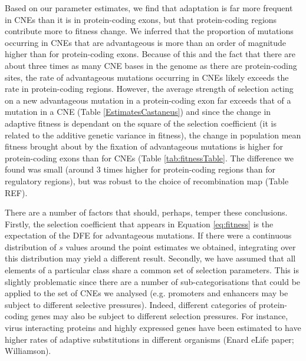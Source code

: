 \documentclass[11pt]{article}
\begin{document}
	Based on our parameter estimates, we find that adaptation is far more frequent in CNEs than it is in protein-coding exons, but that protein-coding regions contribute more to fitness change. We inferred that the proportion of mutations occurring in CNEs that are advantageous is more than an order of magnitude higher than for protein-coding exons. Because of this and the fact that there are about three times as many CNE bases in the genome as there are protein-coding sites, the rate of advantageous mutations occurring in CNEs likely exceeds the rate in protein-coding regions. However, the average strength of selection acting on a new advantageous mutation in a protein-coding exon far exceeds that of a mutation in a CNE (Table \ref{EstimatesCastaneus}) and since the change in adaptive fitness is dependant on the square of the selection coefficient (it is related to the additive genetic variance in fitness), the change in population mean fitness brought about by the fixation of advantageous mutations is higher for protein-coding exons than for CNEs (Table \ref{tab:fitnessTable}. The difference we found was small (around 3 times higher for protein-coding regions than for regulatory regions), but was robust to the choice of recombination map (Table REF).
	
	

%

	There are a number of factors that should, perhaps, temper these conclusions. Firstly, the selection coefficient that appears in Equation \ref{eq:fitness} is the expectation of the DFE for advantageous mutations. If there were a continuous distribution of $s$ values around the point estimates we obtained, integrating over this distribution may yield a different result. Secondly, we have assumed that all elements of a particular class share a common set of selection parameters. This is slightly problematic since there are a number of sub-categorisations that could be applied to the set of CNEs we analysed (e.g. promoters and enhancers may be subject to different selective pressures). Indeed, different categories of protein-coding genes may also be subject to different selection pressures. For instance, virus interacting proteins and highly expressed genes have been estimated to have higher rates of adaptive substitutions in different organisms (Enard eLife paper; Williamson).
\end{document}
